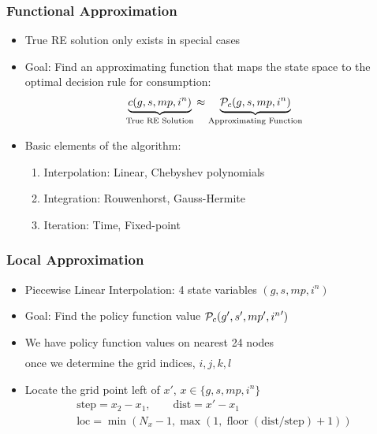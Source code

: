 \documentclass[11pt]{beamer}
\begin{document}
\begin{frame}\frametitle{Functional Approximation}

\begin{itemize}\setlength{\itemsep}{12pt}
  \item <1-|handout:1>True RE solution only exists in special cases %
  \item <2-|handout:1>Goal: Find an approximating function that maps the state space to the optimal decision rule for consumption:
  \begin{gather*}
    \underbrace{c(g,s,mp,i^n)}_{\textrm{True RE Solution}} \approx \underbrace{{\cal{P}}_c(g,s,mp,i^n)}_{\textrm{Approximating Function}}
  \end{gather*}
  \item <3-|handout:1>Basic elements of the algorithm:
  \begin{enumerate}\setlength{\itemsep}{6pt}
    \item Interpolation: Linear, Chebyshev polynomials %
    \item Integration: Rouwenhorst, Gauss-Hermite %
    \item Iteration: Time, Fixed-point 
  \end{enumerate}
\end{itemize}

\end{frame}




\begin{frame}\frametitle{Local Approximation}

\begin{itemize}\setlength{\itemsep}{8pt}
  \item <1-|handout:1>Piecewise Linear Interpolation: 4 state variables $(g,s,mp,i^n)$
  \item <2-|handout:1>Goal: Find the policy function value ${\cal{P}}_c(g',s',mp',{i^n}')$
  \item <3-|handout:1>We have policy function values on nearest 24 nodes
  \begin{gather*}
   [{\cal{P}}_c(g_i,s_j,mp_k,i^n_l), {\cal{P}}_c(g_i,s_j,mp_k,i^n_{l+1}), {\cal{P}}_c(g_i,s_j,mp_{k+1},i^n_l), \\ \dots, {\cal{P}}_c(g_{i+1},s_{j+1},mp_{k+1},i^n_{l+1})]
  \end{gather*}
  once we determine the grid indices, $i,j,k,l$
\item   <4-|handout:1>Locate the grid point left of $x'$, $x \in \{g,s,mp,i^n\}$ %
   \begin{gather*}
    \textrm{step} = x_2 - x_1, \qquad \textrm{dist} = x' - x_1\\
    \textrm{loc} = \min(N_x-1,\max(1,\operatorname{floor}(\textrm{dist}/\textrm{step}) + 1))
    \end{gather*}
\end{itemize}

\end{frame}
\end{document}
